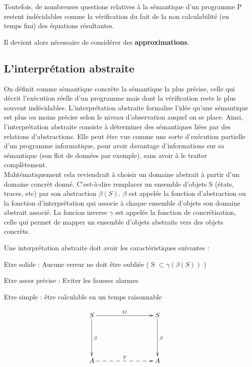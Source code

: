 \documentclass[french]{report}
\begin{document}
Toutefois, de nombreuses questions relatives à la sémantique d'un programme P restent indécidables
comme la vérification du fait de la non calculabilité (en temps fini) des équations résultantes.

Il devient alors nécessaire de considérer des \textbf{approximations}.

\subsection{L'interprétation abstraite}
On définit comme sémantique concrète la sémantique la plus précise, celle qui décrit l'exécution
réelle d'un programme mais dont la vérification reste le plus souvent indécidables.
L’interprétation abstraite formalise l’idée qu’une sémantique est plus ou moins précise
selon le niveau d’observation auquel on se place. Ainsi, l'interprétation abstraite consiste à
déterminer des sémantiques liées par des relations d'abstractions. Elle peut être vue comme une sorte d'exécution partielle d'un programme informatique, pour avoir davantage d'informations sur sa sémantique (son flot de données par exemple), sans avoir à le traiter complètement. \\

Mahtématiquement cela reviendrait à choisir un domaine abstrait à partir d'un domaine concrèt donné. C'est-à-dire remplacer un ensemble d'objets S (états, traces, etc) par son abstraction $\beta(S)$. $\beta$ est appelée la fonction d'abstraction ou la fonction d'interprétation qui associe à chaque ensemble d'objets son domaine abstrait associé. La foncion inverse $\gamma$ est appelée la fonction de concrétisation, celle qui permet de mapper un ensemble d'objets abstraits vers des objets concrèts.

Une interprétation abstraite doit avoir les caractéristiques suivantes :
\begin{description}
    \item Etre solide : Aucune erreur ne doit être oubliée ( S $\subset \gamma(\beta(S))$ )
    \item Etre assez précise : Eviter les fausses alarmes
    \item Etre simple : être calculable en un temps raisonnable
\end{description}

 \begin{equation*}
  \xymatrix@C+6em@R+3em{
   S \ar[r]^{O} \ar[d]^{\beta} & S \ar[d]^{\beta} \\
    A \ar@{-->}[r]^{T} & A
  }
 \end{equation*}
\end{document}
